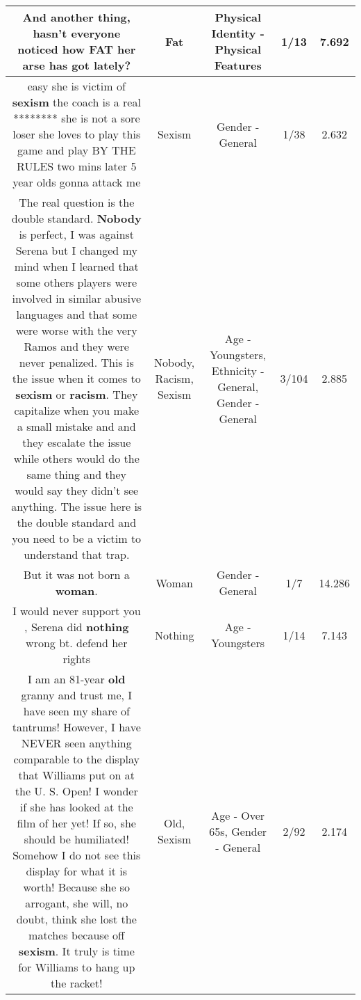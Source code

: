 \documentclass[11pt]{article}
\newlength\mylength
\begin{document}
\begin{center}
\begin{longtable}{|C{.65\mylength}|C{.30\mylength}|C{.12\mylength}|C{.12\mylength}|C{.12\mylength}|}
  \small And another thing, hasn't everyone noticed how \textbf{FAT} her arse has got lately?\normalsize   & Fat & Physical Identity - Physical Features & 1/13 & 7.692 \\  \hline
  \small easy she is victim of \textbf{sexism} the coach is a real ******** she is not a sore loser she loves to play this game and play BY THE RULES two mins later 5 year olds gonna attack me\normalsize   & Sexism & Gender - General & 1/38 & 2.632 \\  \hline
  \small The real question is the double standard. \textbf{Nobody} is perfect, I was against Serena but I changed my mind when I learned that some others players were involved in similar abusive languages and that some were worse with the very Ramos and they were never penalized. This is the issue when it comes to \textbf{sexism} or \textbf{racism}. They capitalize  when you make a small mistake and  and they escalate the issue while others would do the same thing and they would say they didn't see anything. The issue here is the double standard and you need to be a victim to understand that trap.\normalsize   & Nobody, Racism, Sexism & Age - Youngsters, Ethnicity - General, Gender - General & 3/104 & 2.885 \\  \hline
  \small But it was not born a \textbf{woman}.\normalsize   & Woman & Gender - General & 1/7 & 14.286 \\  \hline
  \small I would never support you , Serena did \textbf{nothing} wrong bt. defend her rights\normalsize   & Nothing & Age - Youngsters & 1/14 & 7.143 \\  \hline
  \small I am an 81-year \textbf{old} granny and trust me, I have seen my share of tantrums!  However, I have NEVER seen anything comparable to the display that Williams put on at the U. S. Open!  I wonder if she has looked at the film of her yet!  If so,  she should be humiliated!  Somehow I do not see this display for what it is worth!  Because she so arrogant, she will, no doubt, think she lost the matches because off \textbf{sexism}.  It truly is time for Williams to hang up the racket!\normalsize   & Old, Sexism & Age - Over 65s, Gender - General & 2/92 & 2.174 \\  \hline

\end{longtable}
\end{center}
\end{document}
